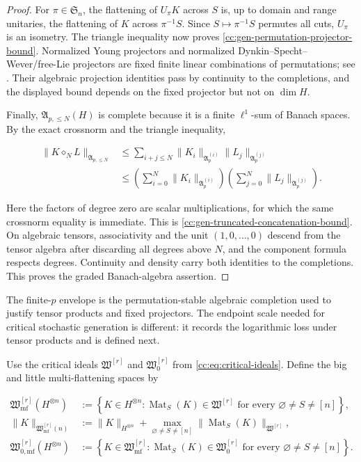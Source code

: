 \documentclass[10pt,reqno]{amsart}
\theoremstyle{plain}
\theoremstyle{definition}
\theoremstyle{remark}
\begin{document}
\begin{proof}
For \(\pi\in\mathfrak S_n\), the flattening of \(U_\pi K\) across \(S\)
is, up to domain and range unitaries, the flattening of \(K\) across
\(\pi^{-1}S\).  Since \(S\mapsto\pi^{-1}S\) permutes all cuts, \(U_\pi\)
is an isometry.  The triangle inequality now proves
\eqref{cc:gen-permutation-projector-bound}.  Normalized Young projectors and
normalized Dynkin--Specht--Wever/free-Lie projectors are fixed finite linear
combinations of permutations; see \cite{Reutenauer93}.  Their algebraic
projection identities pass by continuity to the completions, and the
displayed bound depends on the fixed projector but not on \(\dim H\).

Finally, \(\mathfrak A_{p,\leq N}(H)\) is complete because it is a finite
\(\ell^1\)-sum of Banach spaces.  By the exact crossnorm and the triangle
inequality,

\begin{align*}
 \|K\diamond_NL\|_{\mathfrak A_{p,\leq N}}
 &\leq\sum_{i+j\leq N}
 \|K_i\|_{\mathfrak A_p^{(i)}}
 \|L_j\|_{\mathfrak A_p^{(j)}}\\
 &\leq
 \left(\sum_{i=0}^N\|K_i\|_{\mathfrak A_p^{(i)}}\right)
 \left(\sum_{j=0}^N\|L_j\|_{\mathfrak A_p^{(j)}}\right).
\end{align*}

Here the factors of degree zero are scalar multiplications, for which the same
crossnorm equality is immediate.  This is
\eqref{cc:gen-truncated-concatenation-bound}.  On algebraic tensors,
associativity and the unit \((1,0,\ldots,0)\) descend from the tensor algebra
after discarding all degrees above \(N\), and the component formula respects
degrees.  Continuity and density carry both identities to the completions.
This proves the graded Banach-algebra assertion.
\end{proof}

The finite-\(p\) envelope is the permutation-stable algebraic completion used
to justify tensor products and fixed projectors.  The endpoint scale needed
for critical stochastic generation is different: it records the logarithmic
loss under tensor products and is defined next.

Use the critical ideals \(\mathfrak W^{[r]}\) and
\(\mathfrak W^{[r]}_0\) from \eqref{cc:eq:critical-ideals}.  Define the big
and little multi-flattening spaces by

\begin{align}
 \mathfrak W_{\mathrm{mf}}^{[r]}(H^{\otimes n})
 &:={\left\{K\in H^{\otimes n}:
 \operatorname{Mat}_S(K)\in\mathfrak W^{[r]}
 \text{ for every }\varnothing\ne S\ne[n]\right\}},
 \label{cc:gen-multiflat-space}\\
 \|K\|_{\mathfrak W_{\mathrm{mf}}^{[r]}(n)}
 &:=\|K\|_{H^{\otimes n}}
 +\max_{\varnothing\ne S\ne[n]}
 \|\operatorname{Mat}_S(K)\|_{\mathfrak W^{[r]}},
 \label{cc:gen-multiflat-norm}\\
 \mathfrak W_{0,\mathrm{mf}}^{[r]}(H^{\otimes n})
 &:={\left\{K\in\mathfrak W_{\mathrm{mf}}^{[r]}:
 \operatorname{Mat}_S(K)\in\mathfrak W^{[r]}_0
 \text{ for every }\varnothing\ne S\ne[n]\right\}}.
 \label{cc:gen-little-multiflat}
\end{align}
\end{document}

